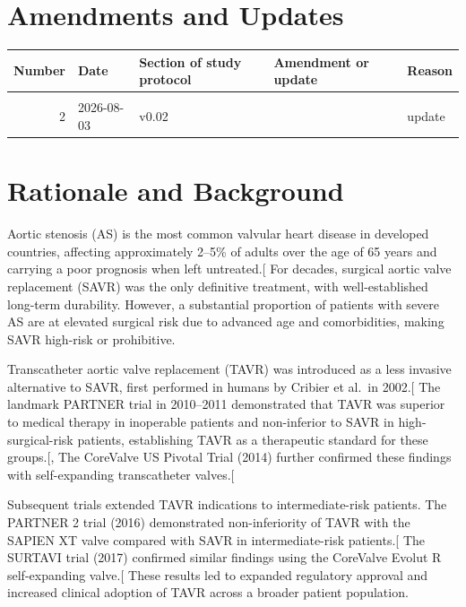 \documentclass[
  12pt,
]{article}
\begin{document}
\section{Amendments and Updates}\label{amendments-and-updates}

\begingroup\fontsize{8}{10}\selectfont

\begin{longtable}[t]{rllll}
\toprule
Number & Date & Section of study protocol & Amendment or update & Reason\\
\midrule
\cellcolor{gray!10}{1} & \cellcolor{gray!10}{2026-06-18} & \cellcolor{gray!10}{v0.01} & \cellcolor{gray!10}{} & \cellcolor{gray!10}{Initial draft}\\
2 & 2026-08-03 & v0.02 &  & update\\
\bottomrule
\end{longtable}
\endgroup{}

\section{Rationale and Background}\label{rationale-and-background}

Aortic stenosis (AS) is the most common valvular heart disease in
developed countries, affecting approximately 2--5\% of adults over the
age of 65 years and carrying a poor prognosis when left
untreated.{[}\citeproc{ref-Lung2003}{1}{]} For decades, surgical aortic
valve replacement (SAVR) was the only definitive treatment, with
well-established long-term durability. However, a substantial proportion
of patients with severe AS are at elevated surgical risk due to advanced
age and comorbidities, making SAVR high-risk or prohibitive.

Transcatheter aortic valve replacement (TAVR) was introduced as a less
invasive alternative to SAVR, first performed in humans by Cribier et
al.~in 2002.{[}\citeproc{ref-Cribier2002}{2}{]} The landmark PARTNER
trial in 2010--2011 demonstrated that TAVR was superior to medical
therapy in inoperable patients and non-inferior to SAVR in
high-surgical-risk patients, establishing TAVR as a therapeutic standard
for these
groups.{[},\citeproc{ref-Smith2011}{4}{]} The
CoreValve US Pivotal Trial (2014) further confirmed these findings with
self-expanding transcatheter valves.{[}\citeproc{ref-Adams2014}{5}{]}

Subsequent trials extended TAVR indications to intermediate-risk
patients. The PARTNER 2 trial (2016) demonstrated non-inferiority of
TAVR with the SAPIEN XT valve compared with SAVR in intermediate-risk
patients.{[}\citeproc{ref-Leon2016}{6}{]} The SURTAVI trial (2017)
confirmed similar findings using the CoreValve Evolut R self-expanding
valve.{[}\citeproc{ref-Reardon2017}{7}{]} These results led to expanded
regulatory approval and increased clinical adoption of TAVR across a
broader patient population.
\end{document}
